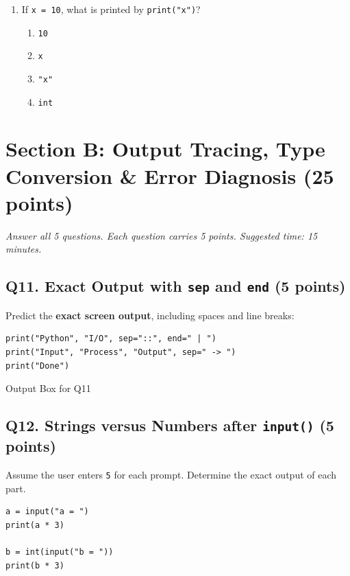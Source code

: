 \documentclass[11pt,a4paper]{article}
\begin{document}
\begin{enumerate}[label=\textbf{Q\arabic*.},leftmargin=2em,itemsep=2pt,topsep=1pt]
\item If \texttt{x = 10}, what is printed by \texttt{print("x")}?
\begin{enumerate}[label=\Alph*.,leftmargin=2em]
  \item \texttt{10}
  \item \texttt{x}
  \item \texttt{"x"}
  \item \texttt{int}
\end{enumerate}

\end{enumerate}

\section*{Section B: Output Tracing, Type Conversion \& Error Diagnosis \hfill \normalsize\normalfont(25 points)}
\textit{Answer all 5 questions. Each question carries 5 points. Suggested time: 15 minutes.}

\subsection*{Q11. Exact Output with \texttt{sep} and \texttt{end} (5 points)}
Predict the \textbf{exact screen output}, including spaces and line breaks:

\begin{lstlisting}
print("Python", "I/O", sep="::", end=" | ")
print("Input", "Process", "Output", sep=" -> ")
print("Done")
\end{lstlisting}

\begin{answerbox}[height=3.0cm]{Output Box for Q11}
\end{answerbox}

\newpage


\subsection*{Q12. Strings versus Numbers after \texttt{input()} (5 points)}
Assume the user enters \texttt{5} for each prompt. Determine the exact output of each part.

\begin{lstlisting}
a = input("a = ")
print(a * 3)

b = int(input("b = "))
print(b * 3)
\end{lstlisting}
\end{document}
